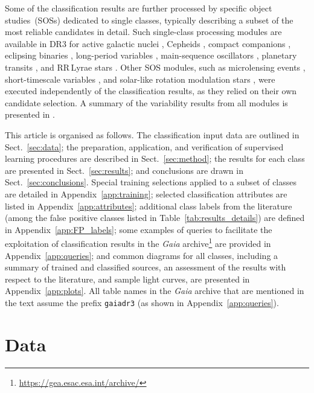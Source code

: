 \documentclass[longauth]{aa}
\def\gaia{\textit{Gaia}\xspace}
\def\gdr3{\textit{Gaia}~DR3\xspace}
\begin{document}
Some of the classification results are further processed by specific object studies~(SOSs) dedicated to single classes, typically describing a subset of the most reliable candidates in detail. Such single-class processing modules are available in DR3 for active galactic nuclei \citep[AGNs][]{DR3-DPACP-167}, Cepheids \citep{DR3-DPACP-169}, compact companions \citep{DR3-DPACP-174}, eclipsing binaries \citep{DR3-DPACP-170}, long-period variables \citep{DR3-DPACP-171}, main-sequence oscillators \citep{DR3-DPACP-79}, planetary transits \citep{DR3-DPACP-181}, and RR\,Lyrae stars \citep{DR3-DPACP-168}. Other SOS modules, such as microlensing events \citep{DR3-DPACP-166}, short-timescale variables \citep[see sect.~10.12 of the \gdr3 documentation;][]{2022gdr3.reptE..10R}, and solar-like rotation modulation stars \citep{DR3-DPACP-173}, were executed independently of the classification results, as they relied on their own candidate selection. A summary of the variability results from all modules is presented in \citet{DR3-DPACP-162}.

This article is organised as follows. The classification input data are outlined in Sect.~\ref{sec:data}; the preparation, application, and verification of supervised learning procedures are described in Sect.~\ref{sec:method}; the results for each class are presented in Sect.~\ref{sec:results}; and conclusions are drawn in Sect.~\ref{sec:conclusions}.
Special training selections applied to a subset of classes are detailed in Appendix~\ref{app:training}; 
selected classification attributes are listed in Appendix~\ref{app:attributes}; 
additional class labels from the literature (among the false positive classes listed in Table~\ref{tab:results_details}) are defined in Appendix~\ref{app:FP_labels};
some examples of queries to facilitate the exploitation of classification results in the \gaia archive\footnote{\url{https://gea.esac.esa.int/archive/}} are provided in Appendix~\ref{app:queries}; 
and common diagrams for all classes, including a summary of trained and classified sources, an assessment of the results with respect to the literature, and sample light curves, are presented in Appendix~\ref{app:plots}. 
All table names in the \gaia archive that are mentioned in the text assume the prefix \texttt{gaiadr3} (as shown in Appendix~\ref{app:queries}).


\section{Data\label{sec:data}}
\end{document}

